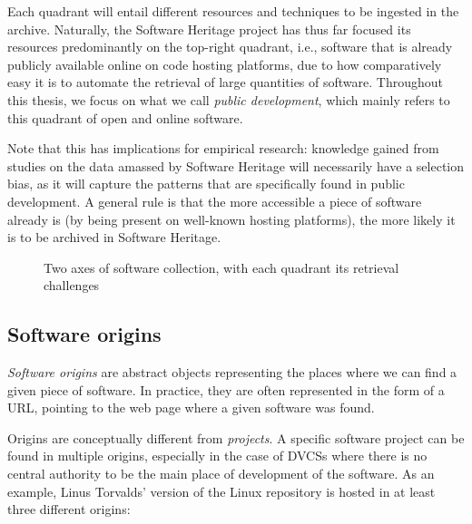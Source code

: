 Each quadrant will entail different resources and techniques to be ingested in
the archive. Naturally, the Software Heritage project has thus far focused its
resources predominantly on the top-right quadrant, i.e., software that is
already publicly available online on code hosting platforms, due to how
comparatively easy it is to automate the retrieval of large quantities of
software.  Throughout this thesis, we focus on what we call \emph{public
development}, which mainly refers to this quadrant of open and online software.

Note that this has implications for empirical research: knowledge gained from
studies on the data amassed by Software Heritage will necessarily have a
selection bias, as it will capture the patterns that are specifically
found in public development. A general rule is that the more accessible a
piece of software already is (by being present on well-known hosting
platforms), the more likely it is to be archived in Software Heritage.

\begin{figure}
    \centering
    \caption{Two axes of software collection, with each quadrant its
    retrieval challenges}%
    \label{fig:swh-collect-axes}
\end{figure}

\subsection{Software origins}

\emph{Software origins} are abstract objects representing the places where we
can find a given piece of software. In practice, they are often represented in
the form of a URL, pointing to the web page where a given software was found.

Origins are conceptually different from \emph{projects}. A specific software
project can be found in multiple origins, especially in the case of \glspl{DVCS}
where there is no central authority to be the main place of development of the
software. As an example, Linus Torvalds' version of the Linux repository is
hosted in at least three different origins:

